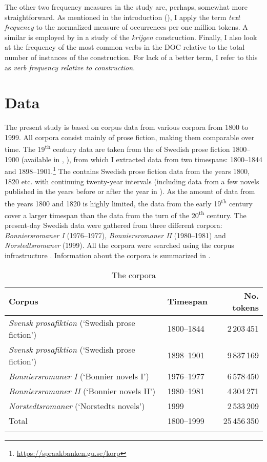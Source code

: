\documentclass[output=paper]{langscibook}
\begin{document}
The other two frequency measures in the study are, perhaps, somewhat more straightforward. As mentioned in the introduction (), I apply the term \textit{text frequency} to the normalized measure of occurrences per one million tokens. A similar  is employed by \citet{Colleman2015} in a study of the  \textit{krijgen}  construction. Finally, I also look at the frequency of the most common verbs in the DOC relative to the total number of instances of the construction. For lack of a better term, I refer to this as \textit{verb frequency relative to construction}.


\section{Data}\label{sec:valdeson:4}


The present study is based on corpus data from various corpora from 1800 to 1999. All corpora consist mainly of prose fiction, making them comparable over time. The 19\textsuperscript{th} century data are taken from the  of Swedish prose fiction 1800–1900 (available in , \citealt{BorinEtAl2012}), from which I extracted data from two timespans: 1800–1844 and 1898–1901.\footnote{\url{https://spraakbanken.gu.se/korp}}  The  contains Swedish prose fiction data from the years 1800, 1820 etc. with continuing twenty-year intervals (including data from a few novels published in the years before or after the year in ). As the amount of data from the years 1800 and 1820 is highly limited, the data from the early 19\textsuperscript{th} century cover a larger timespan than the data from the turn of the 20\textsuperscript{th} century. The present-day Swedish data were gathered from three different corpora: \textit{Bonniersromaner I} (1976–1977), \textit{Bonniersromaner II} (1980–1981) and \textit{Norstedtsromaner} (1999). All the corpora were searched using the corpus infrastructure  \citep{BorinEtAl2012}. Information about the corpora is summarized in .


\begin{table}
\caption{The corpora\label{tab:valdeson:2}}
\begin{tabular}{llr}
\lsptoprule
Corpus & Timespan & No. tokens\\
\midrule
\textit{Svensk prosafiktion} (‘Swedish prose fiction') & 1800–1844 & 2\,203\,451\\
\textit{Svensk prosafiktion} (‘Swedish prose fiction') & 1898–1901 & 9\,837\,169\\
\textit{Bonniersromaner I} (‘Bonnier novels I’) & 1976–1977 & 6\,578\,450\\
\textit{Bonniersromaner II}  (‘Bonnier novels II’) & 1980–1981 & 4\,304\,271\\
\textit{Norstedtsromaner}  (‘Norstedts novels’) & 1999 & 2\,533\,209\\
\midrule
Total & 1800–1999 & 25\,456\,350\\
\lspbottomrule
\end{tabular}
\end{table}
\end{document}
